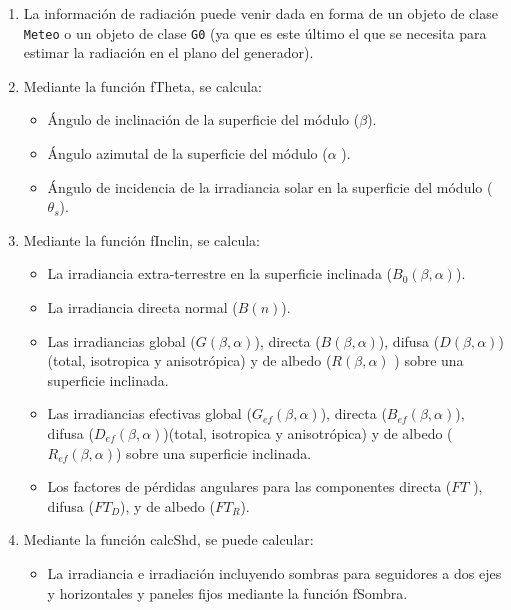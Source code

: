 \begin{enumerate}
\begin{enumerate}
\item La información de radiación puede venir dada en forma de un objeto de clase \texttt{Meteo} o un objeto de clase \texttt{G0} (ya que es este último el que se necesita para estimar la radiación en el plano del generador).
\item Mediante la función fTheta, se calcula:
\begin{itemize}
\item Ángulo de inclinación de la superficie del módulo (\(\beta\)).
\item Ángulo azimutal de la superficie del módulo (\(\alpha\) ).
\item Ángulo de incidencia de la irradiancia solar en la superficie del módulo (\(\theta_s\)).
\end{itemize}
\item Mediante la función fInclin, se calcula:
\begin{itemize}
\item La irradiancia extra-terrestre en la superficie inclinada (\(B_0(\beta, \alpha)\)).
\item La irradiancia directa normal (\(B(n)\)).
\item Las irradiancias global (\(G(\beta, \alpha)\)), directa (\(B(\beta, \alpha)\)), difusa (\(D(\beta, \alpha)\))(total, isotropica y anisotrópica) y de albedo (\(R(\beta, \alpha)\) ) sobre una superficie inclinada.
\item Las irradiancias efectivas global (\(G_{ef}(\beta, \alpha)\)), directa (\(B_{ef}(\beta, \alpha)\)), difusa (\(D_{ef}(\beta, \alpha)\))(total, isotropica y anisotrópica) y de albedo (\(R_{ef}(\beta, \alpha)\)) sobre una superficie inclinada.
\item Los factores de pérdidas angulares para las componentes directa (\(FT\) ), difusa (\(FT_D\)), y de albedo (\(FT_R\)).
\end{itemize}
\item Mediante la función calcShd, se puede calcular:
\begin{itemize}
\item La irradiancia e irradiación incluyendo sombras para seguidores a dos ejes y horizontales y paneles fijos mediante la función fSombra.

\end{itemize}
\end{enumerate}
\end{enumerate}
